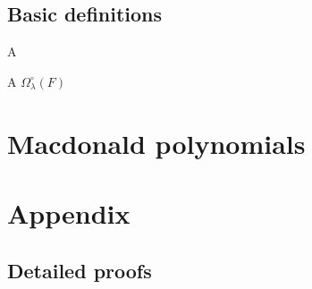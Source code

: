 \documentclass{article}
\begin{document}
\subsection{Basic definitions}

\begin{definition}
    A 
\end{definition}

\begin{definition}
    A  $\Omega^\circ_\lambda(F)$
\end{definition}

\section{Macdonald polynomials}

\section{Appendix}


\subsection{Detailed proofs}
\end{document}
